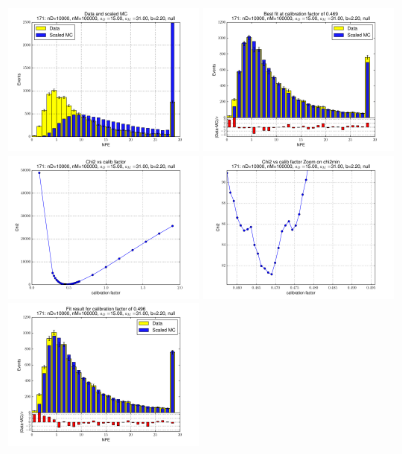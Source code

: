 
 \begin{figure}[htbp] \begin{center} 
\includegraphics[width=0.45\textwidth]{../FIGURES/171/FIG_Data_and_scaled_MC.pdf} 
\includegraphics[width=0.45\textwidth]{../FIGURES/171/FIG_Best_fit_at_calibration_factor_of_0_469.pdf} 
\includegraphics[width=0.45\textwidth]{../FIGURES/171/FIG_Chi2_vs_calib_factor.pdf} 
\includegraphics[width=0.45\textwidth]{../FIGURES/171/FIG_Chi2_vs_calib_factor_Zoom_on_chi2min.pdf} 
\includegraphics[width=0.45\textwidth]{../FIGURES/171/FIG_Fit_result_for_calibration_factor_of_0_496.pdf} 

\end{center}
\end{figure}
